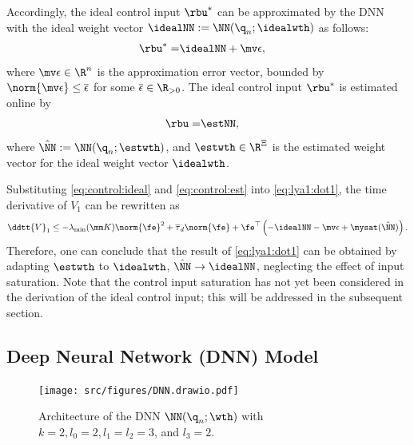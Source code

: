 \documentclass[journal]{IEEEtran}
\begin{document}
Accordingly, the ideal control input $\rbu^*$ can be approximated by the DNN with the ideal weight vector $\idealNN:=\NN({\q}_n;\idealwth)$ as follows:
\begin{align}
    \rbu^*=& \idealNN+\mv\epsilon
    ,
    \label{eq:control:ideal}
\end{align}
where $\mv\epsilon\in\R^n$ is the approximation error vector, bounded by $\norm{\mv\epsilon}\le \overline{\epsilon}$ for some $\overline{\epsilon}\in\R_{>0}$.
The ideal control input $\rbu^*$ is estimated online by
\begin{align}
    \rbu =& \estNN,
    \label{eq:control:est}
\end{align}
where $\hat\NN:=\NN({\q}_n;\estwth)$, and $\estwth\in\R^\Xi$ is the estimated weight vector for the ideal weight vector $\idealwth$.

Substituting \eqref{eq:control:ideal} and \eqref{eq:control:est} into \eqref{eq:lya1:dot1}, the time derivative of $V_1$ can be rewritten as
\begin{equation}
    \ddtt{V}_1
    \le 
    -\lambda_{\min}(\mm K)\norm{\fe}^2
    +
    \overline\tau_d\norm{\fe}
    +
    \fe^\top 
    \left(
        -\idealNN
        -\mv\epsilon
        +\mysat(\hat\NN)
    \right)
    .
    \label{eq:lya1:dot2}
\end{equation}
Therefore, one can conclude that the result of \eqref{eq:lya1:dot1} can be obtained by adapting $\estwth$ to $\idealwth$, \ie $\hat\NN\to\idealNN$, neglecting the effect of input saturation.
Note that the control input saturation has not yet been considered in the derivation of the ideal control input; this will be addressed in the subsequent section.

\subsection{Deep Neural Network (DNN) Model}\label{sec:sub:NN definition}

\begin{figure}[t]
    \centering
    \texttt{[image: src/figures/DNN.drawio.pdf]}
    \caption{
        Architecture of the DNN $\NN({\q}_n;\wth)$ with $k=2,l_0=2,l_1=l_2=3$, and $l_3=2$.
    }
    \label{fig:DNN}
\end{figure}
\end{document}
